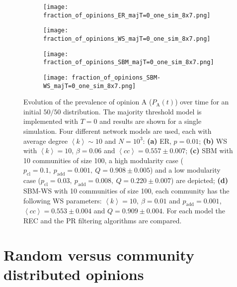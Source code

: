 \documentclass[11 pt , letterpaper , twoside , openright]{book}
\begin{document}
\begin{figure}[H]
  \begin{subfigure}[b]{0.49\textwidth}
    \caption{}
  	\texttt{[image: fraction\_of\_opinions\_ER\_majT=0\_one\_sim\_8x7.png]}
    \label{er_majT}
  \end{subfigure}
  \begin{subfigure}[b]{0.49\textwidth}
    \caption{}
  	\texttt{[image: fraction\_of\_opinions\_WS\_majT=0\_one\_sim\_8x7.png]}
    \label{ws_majT}
  \end{subfigure}
  \begin{subfigure}[b]{0.49\textwidth}
    \caption{}
    \texttt{[image: fraction\_of\_opinions\_SBM\_majT=0\_one\_sim\_8x7.png]}
    \label{sbm_majT}
  \end{subfigure}
  \begin{subfigure}[b]{0.49\textwidth}
    \caption{}
    \texttt{[image: fraction\_of\_opinions\_SBM-WS\_majT=0\_one\_sim\_8x7.png]}
    \label{sbm-ws_majT}
  \end{subfigure}
  \captionsetup{format=plain}
  \caption[Evolution of the prevalence of opinion A ($P_\text{A}(t)$) over time for an initial $50/50$ opinion distribution. Results for one simulation of the majority threshold model with $T=0$.]{Evolution of the prevalence of opinion A ($P_\text{A}(t)$) over time for an initial $50/50$ distribution. The majority threshold model is implemented with $T=0$ and results are shown for a single simulation. Four different network models are used, each with average degree $\left<k\right> \sim 10$ and $N = 10^3$: \textbf{(a)} ER, $p=0.01$; \textbf{(b)} WS with $\left<k\right> = 10$, $\beta = 0.06$ and $\left<cc\right> = 0.557 \pm 0.007$; \textbf{(c)} SBM with 10 communities of size 100, a high modularity case ($p_{\text{cl}} = 0.1,\ p_{\text{add}} = 0.001,\ Q = 0.908 \pm 0.005$) and a low modularity case ($p_{\text{cl}} = 0.03,\ p_{\text{add}} = 0.008,\ Q = 0.220 \pm 0.007$) are depicted; \textbf{(d)} SBM-WS with 10 communities of size 100, each community has the following WS parameters: $\left<k\right> = 10,\ \beta = 0.01$ and $p_{\text{add}} = 0.001$, $\left<cc\right> = 0.553 \pm 0.004$ and $Q = 0.909 \pm 0.004$. For each model the REC and the PR filtering algorithms are compared.}
\label{ev_op_majT_one_sim}
\end{figure}

\section{Random versus community distributed opinions}
\end{document}
